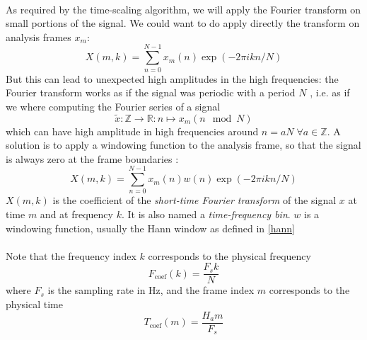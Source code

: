 \documentclass[letterpaper]{article}
\theoremstyle{definition}
\theoremstyle{remark}
\begin{document}
\paragraph{}
As required by the time-scaling algorithm, we will apply the Fourier transform
on small portions of the signal. We could want to do apply directly the
transform on analysis frames \(x_m\):
\begin{equation*}
X(m,k)=\sum_{n=0}^{N-1}x_m(n)\exp(-2\pi ikn/N)
\end{equation*}
But this can lead to unexpected high amplitudes in the high frequencies: the
Fourier transform works as if the signal was periodic with a period \(N\)
\citep{Dolson1986}, i.e. as if we where computing the Fourier series of a signal
\begin{equation}
\tilde x:\mathbb{Z}\to\mathbb{R}:n\mapsto x_m(n\mod N)
\end{equation}
which can have high amplitude in high frequencies around
\(n=aN\;\forall a\in\mathbb{Z}\).
A solution is to apply a windowing function to the analysis frame, so that the
signal is always zero at the frame boundaries \citep{gabor1946theory}:
\begin{equation}
	X(m,k) = \sum_{n=0}^{N-1}x_m(n)w(n)\exp(-2\pi ikn/N)
\end{equation}
\(X(m,k)\) is the coefficient of the \emph{short-time Fourier transform} of
the signal \(x\) at time \(m\) and at frequency \(k\). It is also named a
\emph{time-frequency bin}. \(w\) is a windowing function, usually the Hann
window as defined in \eqref{hann}

\paragraph{}
Note that the frequency index \(k\) corresponds to the physical frequency
\begin{equation}
	\label{frequency_index}
	F_{\text{coef}}(k) = \frac{F_s k}{N}
\end{equation}
where \(F_s\) is the sampling rate in Hz, and the frame index \(m\) corresponds
to the physical time
\begin{equation}
	T_{\text{coef}}(m) = \frac{H_a m}{F_s}
\end{equation}
\end{document}
